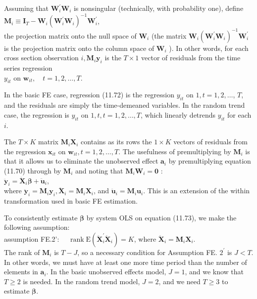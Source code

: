\documentclass[10pt]{article}
\begin{document}
Assuming that $\mathbf{W}_{i}^{\prime} \mathbf{W}_{i}$ is nonsingular (technically, with probability one), define\\
$\mathbf{M}_{i} \equiv \mathbf{I}_{T}-\mathbf{W}_{i}\left(\mathbf{W}_{i}^{\prime} \mathbf{W}_{i}\right)^{-1} \mathbf{W}_{i}^{\prime}$,\\
the projection matrix onto the null space of $\mathbf{W}_{i}$ (the matrix $\mathbf{W}_{i}\left(\mathbf{W}_{i}^{\prime} \mathbf{W}_{i}\right)^{-1} \mathbf{W}_{i}^{\prime}$ is the projection matrix onto the column space of $\mathbf{W}_{i}$ ). In other words, for each cross section observation $i, \mathbf{M}_{i} \mathbf{y}_{i}$ is the $T \times 1$ vector of residuals from the time series regression\\
$y_{i t}$ on $\mathbf{w}_{i t}, \quad t=1,2, \ldots, T$.

In the basic FE case, regression (11.72) is the regression $y_{i t}$ on $1, t=1,2, \ldots$, $T$, and the residuals are simply the time-demeaned variables. In the random trend case, the regression is $y_{i t}$ on $1, t, t=1,2, \ldots, T$, which linearly detrends $y_{i t}$ for each $i$.

The $T \times K$ matrix $\mathbf{M}_{i} \mathbf{X}_{i}$ contains as its rows the $1 \times K$ vectors of residuals from the regression $\mathbf{x}_{i t}$ on $\mathbf{w}_{i t}, t=1,2, \ldots, T$. The usefulness of premultiplying by $\mathbf{M}_{i}$ is that it allows us to eliminate the unobserved effect $\mathbf{a}_{i}$ by premultiplying equation (11.70) through by $\mathbf{M}_{i}$ and noting that $\mathbf{M}_{i} \mathbf{W}_{i}=\mathbf{0}$ :\\
$\ddot{\mathbf{y}}_{i}=\ddot{\mathbf{X}}_{i} \boldsymbol{\beta}+\ddot{\mathbf{u}}_{i}$,\\
where $\ddot{\mathbf{y}}_{i}=\mathbf{M}_{i} \mathbf{y}_{i}, \ddot{\mathbf{X}}_{i}=\mathbf{M}_{i} \mathbf{X}_{i}$, and $\ddot{\mathbf{u}}_{i}=\mathbf{M}_{i} \mathbf{u}_{i}$. This is an extension of the within transformation used in basic FE estimation.

To consistently estimate $\boldsymbol{\beta}$ by system OLS on equation (11.73), we make the following assumption:\\
assumption FE.2': $\quad \operatorname{rank} \mathrm{E}\left(\ddot{\mathbf{X}}_{i}^{\prime} \ddot{\mathbf{X}}_{i}\right)=K$, where $\ddot{\mathbf{X}}_{i}=\mathbf{M}_{i} \mathbf{X}_{i}$.\\
The rank of $\mathbf{M}_{i}$ is $T-J$, so a necessary condition for Assumption FE. $2^{\prime}$ is $J<T$. In other words, we must have at least one more time period than the number of elements in $\mathbf{a}_{i}$. In the basic unobserved effects model, $J=1$, and we know that $T \geq 2$ is needed. In the random trend model, $J=2$, and we need $T \geq 3$ to estimate $\boldsymbol{\beta}$.
\end{document}
